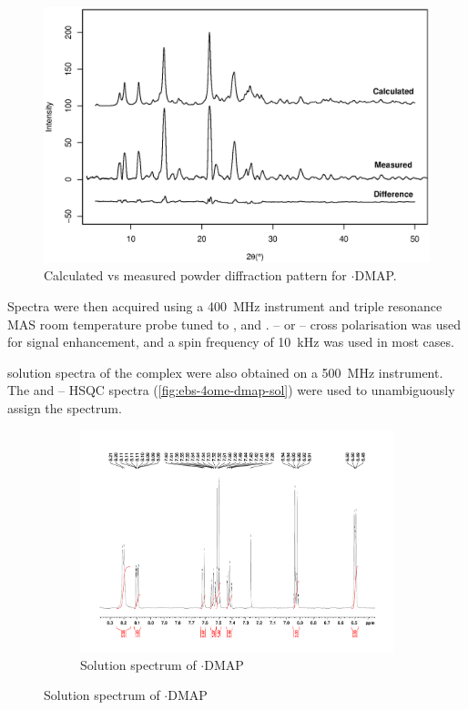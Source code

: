 \begin{refsection}
\begin{figure}
    \centering
    \includegraphics[width=0.9\linewidth]{Figures/ebs-4ome-dmap-pdx.eps}
    \caption{Calculated vs measured powder diffraction pattern for $\cdot$DMAP.}
    \label{fig:ebs-4ome-dmap-pdx}
\end{figure}

Spectra were then acquired using a 400~MHz instrument and triple resonance MAS room temperature probe tuned to ,  and  .
-- or -- cross polarisation was used for signal enhancement, and a spin frequency of 10~kHz was used in most cases.

 solution spectra of the complex were also obtained on a 500~MHz instrument.
The  and -- HSQC spectra (\cref{fig:ebs-4ome-dmap-sol}) were used to unambiguously assign the  spectrum.

\begin{figure}
    \centering
    \begin{subfigure}[t]{\linewidth}
    \centering
    \includegraphics[width=0.9\linewidth]{Figures/ebs-4ome-dmap-sol-1h.pdf}
    \caption{Solution  spectrum of $\cdot$DMAP}
    \label{fig:ebs-4ome-dmap-sol-1h}
    \end{subfigure}


\end{figure}
\end{refsection}
